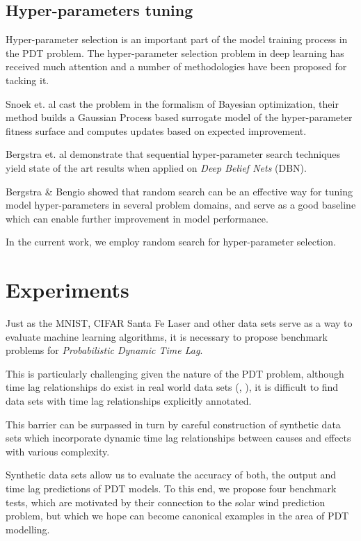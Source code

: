\documentclass[envcountsect,runningheads]{llncs}
\theoremstyle{etoile}
\begin{document}
\subsection{Hyper-parameters tuning}

Hyper-parameter selection is an important part of the model training process in the PDT problem. 
The hyper-parameter selection problem in deep learning has received much attention and a number 
of methodologies have been proposed for tacking it. 

Snoek et. al \cite{snoek2012practical} cast the problem in the formalism of Bayesian optimization, their method 
builds a Gaussian Process based surrogate model of the hyper-parameter fitness surface and computes 
updates based on expected improvement. 


Bergstra et. al \cite{hypBengio} demonstrate that sequential hyper-parameter search techniques yield state of the art 
results when applied on \emph{Deep Belief Nets} (DBN). 

Bergstra \& Bengio \cite{randomsearchBengio} showed that random search can be an effective way for tuning model 
hyper-parameters in several problem domains, and serve as a good baseline which can enable 
further improvement in model performance.

In the current work, we employ random search for hyper-parameter selection. 



\section{Experiments}\label{sec:exp}


Just as the MNIST, CIFAR Santa Fe Laser and other data sets serve as a way to evaluate machine learning 
algorithms, it is necessary to propose benchmark problems for \emph{Probabilistic Dynamic Time Lag}.

This is particularly challenging given the nature of the PDT problem, although time lag 
relationships do exist in real world data sets (\cite{doi:10.1002/jgra.50429}, \cite{ZHOU2006195}), 
it is difficult to find data sets with time lag relationships explicitly annotated.

This barrier can be surpassed in turn by careful construction of synthetic data sets which incorporate 
dynamic time lag relationships between causes and effects with various complexity.

Synthetic data sets allow us to evaluate the accuracy of both, the output and time lag predictions of 
PDT models. To this end, we propose four benchmark tests, which are motivated by their connection 
to the solar wind prediction problem, but which we hope can become canonical examples in the area 
of PDT modelling.
\end{document}
